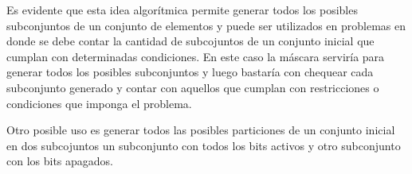 Es evidente que esta idea algorítmica permite generar todos los posibles subconjuntos de un conjunto de elementos y puede ser utilizados en problemas en donde se debe contar la cantidad de subcojuntos de un conjunto inicial que cumplan con determinadas condiciones. En este caso la máscara serviría para generar todos los posibles subconjuntos y luego bastaría con chequear cada subconjunto generado y contar con aquellos que cumplan con restricciones o condiciones que imponga el problema.

Otro posible uso es generar todos las posibles particiones de un conjunto inicial en dos subcojuntos un subconjunto con todos los bits activos y otro subconjunto con los bits apagados. 
